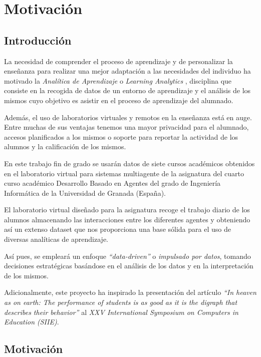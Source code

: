 \chapter*{Motivación}\label{sec:motivation}

\section{Introducción}

La necesidad de comprender el proceso de aprendizaje y de personalizar la enseñanza para realizar una mejor adaptación a las necesidades del individuo ha motivado la \emph{Analítica de Aprendizaje} o \emph{Learning Analytics} \cite{Elias:LearningAnalytics}, disciplina que consiste en la recogida de datos de un entorno de aprendizaje y el análisis de los mismos cuyo objetivo es asistir en el proceso de aprendizaje del alumnado.

Además, el uso de laboratorios virtuales y remotos en la enseñanza está en auge. Entre muchas de sus ventajas tenemos una mayor privacidad para el alumnado, accesos planificados a los mismos o soporte para reportar la actividad de los alumnos y la calificación de los mismos.

En este trabajo fin de grado se usarán datos de siete cursos académicos obtenidos en el laboratorio virtual para sistemas multiagente de la asignatura del cuarto curso académico Desarrollo Basado en Agentes del grado de Ingeniería Informática de la Universidad de Granada (España).

El laboratorio virtual diseñado para la asignatura recoge el trabajo diario de los alumnos almacenando las interacciones entre los diferentes agentes y obteniendo así un extenso dataset que nos proporciona una base sólida para el uso de diversas analíticas de aprendizaje.

Así pues, se empleará un enfoque \emph{``data-driven''} o \emph{impulsado por datos}, tomando decisiones estratégicas basándose en el análisis de los datos y en la interpretación de los mismos.

Adicionalmente, este proyecto ha inspirado la presentación del artículo \emph{``In heaven as on earth: The performance of students is as good as it is the digraph that describes their behavior''} \cite{SIIE23} al \emph{XXV International Symposium on Computers in Education (SIIE)}.

\section{Motivación}

